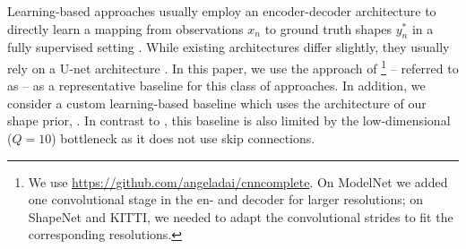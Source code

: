 

%
Learning-based approaches usually employ an encoder-decoder architecture to directly learn a mapping from observations $x_n$ to ground truth shapes $y_n^*$ in a fully supervised setting \citep{Wang2017ICCV,Varley2017IROS,Yang2018ARXIVb,Yang2017ARXIV,Dai2017CVPRa}. While existing architectures differ slightly, they usually rely on a U-net architecture \citep{Ronneberger2015MICCAI,Cicek2016ARXIV}. In this paper, we use the approach of \cite{Dai2017CVPRa}\footnote{
    We use \url{https://github.com/angeladai/cnncomplete}. On ModelNet we added one convolutional stage in the en- and decoder for larger resolutions; on ShapeNet and KITTI, we needed to adapt the convolutional strides to fit the corresponding resolutions.
} -- referred to as \Dai\xspace --
as a representative baseline for this class of approaches. In addition, we consider a custom learning-based baseline which uses the architecture of our \DVAE shape prior, \cf {}. In contrast to \citep{Dai2017CVPRa}, this baseline is also limited by the low-dimensional ($Q = 10$) bottleneck as it does not use skip connections.